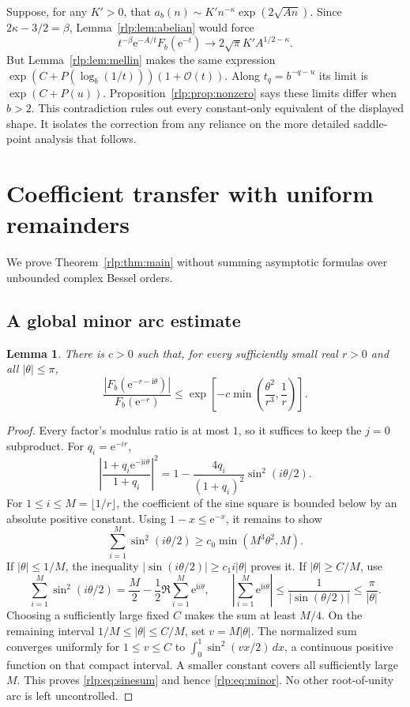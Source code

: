 \documentclass[11pt,letterpaper]{article}
\numberwithin{equation}{section}
\newtheorem{lemma}[theorem]{Lemma}
\theoremstyle{remark}\newtheorem{remark}[theorem]{Remark}
\newcommand{\ii}{\mathrm i}
\newcommand{\ee}{\mathrm e}
\newcommand{\Ord}{\mathcal O}
\begin{document}
Suppose, for any $K'>0$, that
$a_b(n)\sim K'n^{-\kappa}\exp(2\sqrt{An})$. Since $2\kappa-3/2=\beta$, Lemma~\ref{rlp:lem:abelian} would force
\[
 t^{-\beta}\ee^{-A/t}F_b(\ee^{-t})
 \longrightarrow 2\sqrt\pi K'A^{1/2-\kappa}.
\]
But Lemma~\ref{rlp:lem:mellin} makes the same expression
$\exp(C+P(\log_b(1/t)))(1+\Ord(t))$. Along $t_q=b^{-q-u}$ its limit is $\exp(C+P(u))$. Proposition~\ref{rlp:prop:nonzero} says these limits differ when $b>2$. This contradiction rules out every constant-only equivalent of the displayed shape. It isolates the correction from any reliance on the more detailed saddle-point analysis that follows.

\section{Coefficient transfer with uniform remainders}
\label{rlp:sec:transfer}
We prove Theorem~\ref{rlp:thm:main} without summing asymptotic formulas over unbounded complex Bessel orders.

\subsection{A global minor arc estimate}
\begin{lemma}\label{rlp:lem:minor}
There is $c>0$ such that, for every sufficiently small real $r>0$ and all $|\theta|\le\pi$,
\begin{equation}\label{rlp:eq:minor}
 \frac{|F_b(\ee^{-r-\ii\theta})|}{F_b(\ee^{-r})}
 \le\exp\left[-c\min\left(\frac{\theta^2}{r^3},\frac1r\right)\right].
\end{equation}
\end{lemma}
\begin{proof}
Every factor's modulus ratio is at most $1$, so it suffices to keep the $j=0$ subproduct. For $q_i=\ee^{-ir}$,
\[
 \left|\frac{1+q_i\ee^{-\ii i\theta}}{1+q_i}\right|^2
 =1-\frac{4q_i}{(1+q_i)^2}\sin^2(i\theta/2).
\]
For $1\le i\le M=\lfloor1/r\rfloor$, the coefficient of the sine square is bounded below by an absolute positive constant. Using $1-x\le\ee^{-x}$, it remains to show
\begin{equation}\label{rlp:eq:sinesum}
 \sum_{i=1}^M\sin^2(i\theta/2)
 \ge c_0\min(M^3\theta^2,M).
\end{equation}
If $|\theta|\le1/M$, the inequality $|\sin(i\theta/2)|\ge c_1i|\theta|$ proves it. If $|\theta|\ge C/M$, use
\[
 \sum_{i=1}^M\sin^2(i\theta/2)
 =\frac M2-\frac12\Re\sum_{i=1}^M\ee^{\ii i\theta},
 \qquad
 \left|\sum_{i=1}^M\ee^{\ii i\theta}\right|
 \le\frac1{|\sin(\theta/2)|}\le\frac\pi{|\theta|}.
\]
Choosing a sufficiently large fixed $C$ makes the sum at least $M/4$. On the remaining interval $1/M\le|\theta|\le C/M$, set $v=M|\theta|$. The normalized sum converges uniformly for $1\le v\le C$ to
$\int_0^1\sin^2(vx/2)\,dx$, a continuous positive function on that compact interval. A smaller constant covers all sufficiently large $M$. This proves \eqref{rlp:eq:sinesum} and hence \eqref{rlp:eq:minor}. No other root-of-unity arc is left uncontrolled.
\end{proof}
\end{document}
